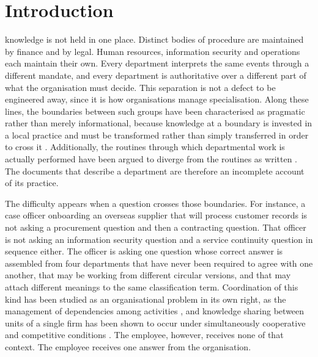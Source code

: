 \documentclass[journal]{IEEEtran}
\begin{document}
\section{Introduction}

 knowledge is not held in one place. Distinct bodies of procedure are maintained by finance and by legal. Human resources, information security and operations each maintain their own. Every department interprets the same events through a different mandate, and every department is authoritative over a different part of what the organisation must decide. This separation is not a defect to be engineered away, since it is how organisations manage specialisation. Along these lines, the boundaries between such groups have been characterised as pragmatic rather than merely informational, because knowledge at a boundary is invested in a local practice and must be transformed rather than simply transferred in order to cross it \cite{carlile2004transforming}. Additionally, the routines through which departmental work is actually performed have been argued to diverge from the routines as written \cite{feldman2003routines}. The documents that describe a department are therefore an incomplete account of its practice.

The difficulty appears when a question crosses those boundaries. For instance, a case officer onboarding an overseas supplier that will process customer records is not asking a procurement question and then a contracting question. That officer is not asking an information security question and a service continuity question in sequence either. The officer is asking one question whose correct answer is assembled from four departments that have never been required to agree with one another, that may be working from different circular versions, and that may attach different meanings to the same classification term. Coordination of this kind has been studied as an organisational problem in its own right, as the management of dependencies among activities \cite{malone1994coordination}, and knowledge sharing between units of a single firm has been shown to occur under simultaneously cooperative and competitive conditions \cite{tsai2002coopetition}. The employee, however, receives none of that context. The employee receives one answer from the organisation.
\end{document}
